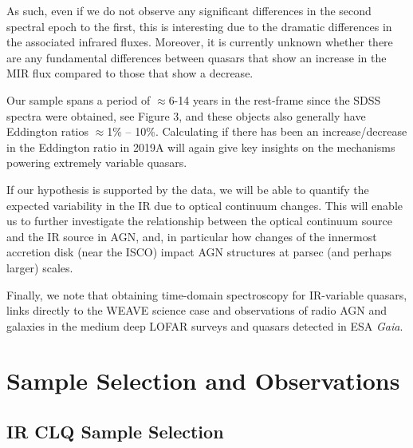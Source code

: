\documentclass[a4paper,fleqn,usenatbib]{mnras}
\begin{document}
As such, even if we do not observe any significant differences in the
second spectral epoch to the first, this is interesting due to the
dramatic differences in the associated infrared fluxes. Moreover, it
is currently unknown whether there are any fundamental differences
between quasars that show an increase in the MIR flux compared to
those that show a decrease.

Our sample spans a period of $\approx$6-14 years in the rest-frame
since the SDSS spectra were obtained, see Figure 3, and these objects
also generally have Eddington ratios $\approx$1\% -- 10\%. Calculating
if there has been an increase/decrease in the Eddington ratio in 2019A
will again give key insights on the mechanisms powering extremely
variable quasars.

If our hypothesis is supported by the data, we will be able to
quantify the expected variability in the IR due to optical continuum
changes. This will enable us to further investigate the relationship
between the optical continuum source and the IR source in AGN, and, in
particular how changes of the innermost accretion disk (near the ISCO)
impact AGN structures at parsec (and perhaps larger) scales.

Finally, we note that obtaining time-domain spectroscopy for
IR-variable quasars, links directly to the WEAVE science case and
observations of radio AGN and galaxies in the medium deep LOFAR
surveys and quasars detected in ESA {\it Gaia}.





\section{Sample Selection and Observations}\label{sec:data} 

\subsection{IR CLQ Sample Selection}

\end{document}
